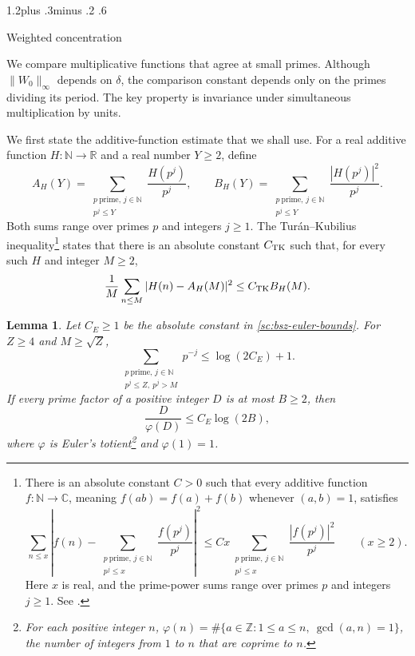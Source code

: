 \documentclass[twoside]{aomart}
\makeatletter
\theoremstyle{paperplain}
\newtheorem{lemma}[theorem]{Lemma}
\theoremstyle{paperdefinition}
\renewcommand\section{\@startsection{section}{1}{\z@}
  {1.2\baselineskip plus .3\baselineskip minus .2\baselineskip}
  {.6\baselineskip}{\normalfont\large\bfseries\raggedright}}
\newcommand{\Z}{\mathbb Z}
\newcommand{\N}{\mathbb N}
\newcommand{\R}{\mathbb R}
\newcommand{\C}{\mathbb C}
\numberwithin{equation}{section}
\makeatother
\begin{document}
\section{Weighted concentration}
\label{con:section}

We compare multiplicative functions that agree at small primes.
Although $\|W_0\|_\infty$ depends on $\delta$, the comparison
constant depends only on the primes dividing its period.
The key property is invariance under simultaneous multiplication
by units.

We first state the additive-function estimate that we shall use.
For a real additive function $H:\N\to\R$ and a real number
$Y\ge2$, define
\begin{equation*}
 A_H(Y)=\sum_{\substack{p\ \mathrm{prime},\,j\in\N\\p^j\le Y}}\frac{H(p^j)}{p^j},
 \qquad
 B_H(Y)=\sum_{\substack{p\ \mathrm{prime},\,j\in\N\\p^j\le Y}}\frac{|H(p^j)|^2}{p^j}.
\end{equation*}
Both sums range over primes $p$ and integers $j\ge1$.
The Tur\'an--Kubilius inequality\footnote{There is an absolute constant $C>0$ such that
every additive function $f:\N\to\C$, meaning
$f(ab)=f(a)+f(b)$ whenever $(a,b)=1$, satisfies
\[
 \sum_{n\le x}\left|f(n)-\sum_{\substack{p\ \mathrm{prime},\,j\in\N\\p^j\le x}}\frac{f(p^j)}{p^j}\right|^2
 \le Cx\sum_{\substack{p\ \mathrm{prime},\,j\in\N\\p^j\le x}}\frac{|f(p^j)|^2}{p^j}
 \qquad(x\ge2).
\]
Here $x$ is real, and the prime-power sums range over primes $p$
and integers $j\ge1$. See \cite[p.~893, equation~(1)]{Elliott}.}
states that there is an absolute constant $C_{\rm TK}$ such that,
for every such $H$ and integer $M\ge2$,
\begin{equation}
 \frac1M\sum_{n\le M}|H(n)-A_H(M)|^2
 \le C_{\rm TK}B_H(M).
 \label{con:TK}
\end{equation}

\begin{lemma}
\label{con:prime-estimates}
Let $C_E\ge1$ be the absolute constant in
\eqref{sc:bsz-euler-bounds}.  For $Z\ge4$ and $M\ge\sqrt Z$,
\begin{equation}
 \sum_{\substack{p\ \mathrm{prime},\,j\in\N\\p^j\le Z,\ p^j>M}}p^{-j}
 \le\log(2C_E)+1.
 \label{con:prime-power-interval}
\end{equation}
If every prime factor of a positive integer $D$ is at most
$B\ge2$, then
\begin{equation*}
 \frac D{\varphi(D)}\le C_E\log(2B),
\end{equation*}
where $\varphi$ is Euler's totient\footnote{For each positive integer
$n$, $\varphi(n)=\#\{a\in\Z:1\le a\le n,\ \gcd(a,n)=1\}$,
the number of integers from $1$ to $n$ that are coprime to $n$.}
and $\varphi(1)=1$.
\end{lemma}
\end{document}
